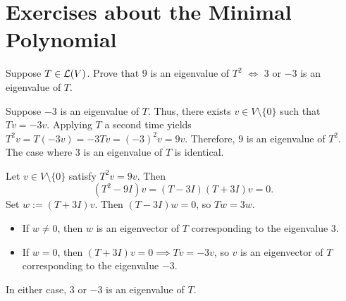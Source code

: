 \section*{Exercises about the Minimal Polynomial}

\begin{xrcs}
  Suppose $T \in \mathcal{L}(V)$. Prove that $9$ is an eigenvalue of $T^2$ $\iff$ $3$ or $-3$ is an eigenvalue of $T$.

  \begin{xprf}
    \Leftarrowdirection Suppose $-3$ is an eigenvalue of $T$. Thus, there exists $v \in V \setminus \{0\}$ such that $Tv = -3v$. Applying $T$ a second time yields $T^2 v = T(-3v) = -3 Tv = (-3)^2 v = 9v$. Therefore, $9$ is an eigenvalue of $T^2$. The case where $3$ is an eigenvalue of $T$ is identical.

    \Rightarrowdirection Let $v \in V \setminus \{0\}$ satisfy $T^2 v = 9v$. Then
    \begin{equation}
      (T^2 - 9I) v = (T - 3I)(T + 3I) v = 0.
    \end{equation}
    Set $w := (T + 3I)v$. Then $(T - 3I)w = 0$, so $Tw = 3w$.
    \begin{itemize}
      \item If $w \neq 0$, then $w$ is an eigenvector of $T$ corresponding to the eigenvalue $3$.
      \item If $w = 0$, then $(T + 3I)v = 0 \implies Tv = -3v$, so $v$ is an eigenvector of $T$ corresponding to the eigenvalue $-3$.
    \end{itemize}
    In either case, $3$ or $-3$ is an eigenvalue of $T$.
  \end{xprf}
\end{xrcs}


